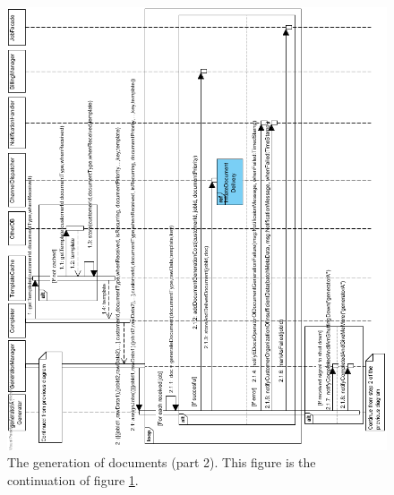 \documentclass[a4paper,10pt]{article}
\begin{document}
\begin{figure}[!htp]
    \centering
    \includegraphics[width=\textwidth]{ProcessJobs2.png}
    \caption{The generation of documents (part 2). This figure is the continuation of figure \ref{fig:seq_ProcessJobs2}.
        }\label{fig:seq_ProcessJobs2}
\end{figure}
\end{document}

